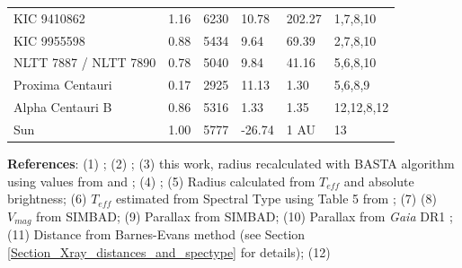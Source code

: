 \begin{appendices}
\begin{minipage}{\textwidth}
{\begin{tabular}[h]{l l l l l l}
		KIC 9410862 & 1.16 & 6230 & 10.78 & 202.27 & 1,7,8,10 \\
		KIC 9955598 & 0.88 & 5434 & 9.64 & 69.39 & 2,7,8,10 \\
		NLTT 7887 / NLTT 7890 & 0.78 & 5040 & 9.84 & 41.16 & 5,6,8,10 \\
		Proxima Centauri & 0.17 & 2925 & 11.13 & 1.30 & 5,6,8,9 \\
		Alpha Centauri B & 0.86 & 5316 & 1.33 & 1.35 & 12,12,8,12 \\
		Sun  & 1.00 & 5777 & -26.74 & 1 AU & 13 \\    
		\hline 
	\end{tabular}}
	
	\medskip
	
	\begin{footnotesize}		
	\noindent
	\textbf{References}: (1) \citet{Silva_Aguirre_etal_2017}; (2) \citet{Silva_Aguirre_etal_2015}; (3) this work, radius recalculated with BASTA algorithm \citep{Silva_Aguirre_etal_2015} using values from \citet{Chaplin_etal_2014} and  \citet{Buchhave_Latham_2015}; (4) \citet{Kervella_etal_2008}; (5) Radius calculated from $T_{eff}$ and absolute brightness; (6) $T_{eff}$ estimated from Spectral Type using Table 5 from \citet{Pecaut_Mamajek_2013}; (7) \citet{Chaplin_etal_2014}
	(8) $V_{mag}$ from SIMBAD; (9) Parallax from SIMBAD; (10) Parallax from \textit{Gaia} DR1 \citep{Gaia_Collaboration_2016_DR1}; (11) Distance from Barnes-Evans method (see Section \ref{Section_Xray_distances_and_spectype} for details); (12) \citet{DeWarf_etal_2010}
	\end{footnotesize}

\end{minipage}


















\end{appendices}